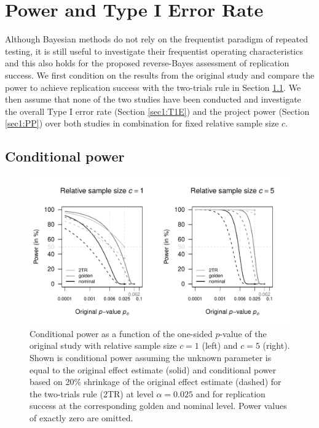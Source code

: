 \section{Power and Type I Error Rate}\label{sec1:ER}
Although Bayesian methods do not rely on the frequentist paradigm of repeated
testing, it is still useful to investigate their frequentist operating
characteristics \citep{Dawid1982, Rubin1984, Grieve2016} and this also holds for
the proposed reverse-Bayes assessment of replication success. We first condition
on the results from the original study and compare the power to achieve
replication success with the two-trials rule in Section \ref{sec1:powerrep}. We
then assume that none of the two studies have been conducted and investigate the
overall Type I error rate (Section \ref{sec1:T1E}) and the project power (Section
\ref{sec1:PP}) \citep{Maca2002} over both studies in combination for fixed
relative sample size $c$.

\subsection{Conditional power}\label{sec1:powerrep}


\begin{figure}[!ht]
\begin{center}
\begin{knitrout}
\color{fgcolor}

{\centering \includegraphics[width=\maxwidth]{images/paper1/fig3-1}

}

\end{knitrout}
\end{center}
\caption{Conditional power as a function of the {one-sided} $p$-value of the
  original study with relative sample size $c=1$ (left) and $c=5$ (right). Shown
  is conditional power assuming the unknown parameter is equal to the original
  effect estimate (solid) and conditional power based on 20\% shrinkage of the
  original effect estimate (dashed) for the two-trials rule (2TR) at level
  $\alpha = 0.025$ and for replication success at the corresponding golden and
  nominal level. Power values of exactly zero are omitted.}
\label{fig1:fig3}
\end{figure}

